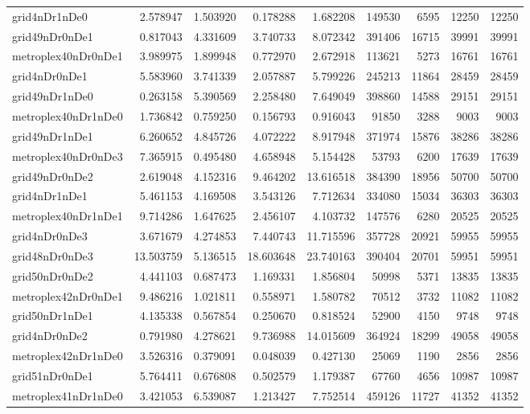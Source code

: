 \begin{longtable}{|l|r|r|r|r|r|r|r|r|}
grid4nDr1nDe0 & 2.578947 & 1.503920 & 0.178288 & 1.682208 & 149530 & 6595 & 12250 & 12250 \\
grid49nDr0nDe1 & 0.817043 & 4.331609 & 3.740733 & 8.072342 & 391406 & 16715 & 39991 & 39991 \\
metroplex40nDr0nDe1 & 3.989975 & 1.899948 & 0.772970 & 2.672918 & 113621 & 5273 & 16761 & 16761 \\
grid4nDr0nDe1 & 5.583960 & 3.741339 & 2.057887 & 5.799226 & 245213 & 11864 & 28459 & 28459 \\
grid49nDr1nDe0 & 0.263158 & 5.390569 & 2.258480 & 7.649049 & 398860 & 14588 & 29151 & 29151 \\
metroplex40nDr1nDe0 & 1.736842 & 0.759250 & 0.156793 & 0.916043 & 91850 & 3288 & 9003 & 9003 \\
grid49nDr1nDe1 & 6.260652 & 4.845726 & 4.072222 & 8.917948 & 371974 & 15876 & 38286 & 38286 \\
metroplex40nDr0nDe3 & 7.365915 & 0.495480 & 4.658948 & 5.154428 & 53793 & 6200 & 17639 & 17639 \\
grid49nDr0nDe2 & 2.619048 & 4.152316 & 9.464202 & 13.616518 & 384390 & 18956 & 50700 & 50700 \\
grid4nDr1nDe1 & 5.461153 & 4.169508 & 3.543126 & 7.712634 & 334080 & 15034 & 36303 & 36303 \\
metroplex40nDr1nDe1 & 9.714286 & 1.647625 & 2.456107 & 4.103732 & 147576 & 6280 & 20525 & 20525 \\
grid4nDr0nDe3 & 3.671679 & 4.274853 & 7.440743 & 11.715596 & 357728 & 20921 & 59955 & 59955 \\
grid48nDr0nDe3 & 13.503759 & 5.136515 & 18.603648 & 23.740163 & 390404 & 20701 & 59951 & 59951 \\
grid50nDr0nDe2 & 4.441103 & 0.687473 & 1.169331 & 1.856804 & 50998 & 5371 & 13835 & 13835 \\
metroplex42nDr0nDe1 & 9.486216 & 1.021811 & 0.558971 & 1.580782 & 70512 & 3732 & 11082 & 11082 \\
grid50nDr1nDe1 & 4.135338 & 0.567854 & 0.250670 & 0.818524 & 52900 & 4150 & 9748 & 9748 \\
grid4nDr0nDe2 & 0.791980 & 4.278621 & 9.736988 & 14.015609 & 364924 & 18299 & 49058 & 49058 \\
metroplex42nDr1nDe0 & 3.526316 & 0.379091 & 0.048039 & 0.427130 & 25069 & 1190 & 2856 & 2856 \\
grid51nDr0nDe1 & 5.764411 & 0.676808 & 0.502579 & 1.179387 & 67760 & 4656 & 10987 & 10987 \\
metroplex41nDr1nDe0 & 3.421053 & 6.539087 & 1.213427 & 7.752514 & 459126 & 11727 & 41352 & 41352 \\

\end{longtable}
